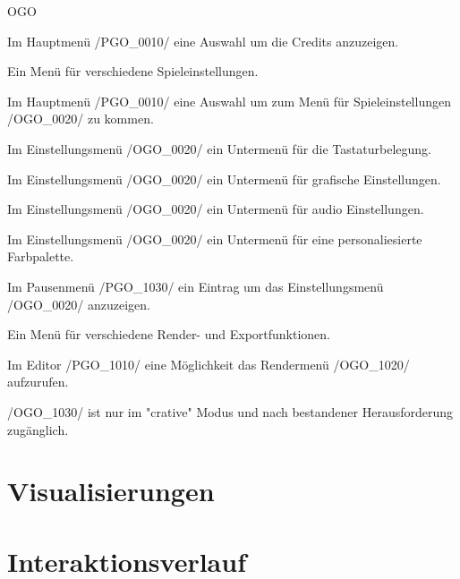 \begin{ids}{\gls{OGO}}

	\id[0010] Im Hauptmenü /PGO\_0010/ eine Auswahl um die Credits anzuzeigen.
	
	\id[0020] Ein Menü für verschiedene Spieleinstellungen.
	
	\id[0030] Im Hauptmenü /PGO\_0010/ eine Auswahl um zum Menü für Spieleinstellungen /OGO\_0020/ zu kommen.
	
	\id[0040] Im Einstellungsmenü /OGO\_0020/ ein Untermenü für die Tastaturbelegung.
	
	\id[0050] Im Einstellungsmenü /OGO\_0020/ ein Untermenü für grafische Einstellungen.
	
	\id[0060] Im Einstellungsmenü /OGO\_0020/ ein Untermenü für audio Einstellungen.
	
	\id[0070] Im Einstellungsmenü /OGO\_0020/ ein Untermenü für eine personaliesierte Farbpalette.
	
	\id[1010] Im Pausenmenü /PGO\_1030/ ein Eintrag um das Einstellungsmenü /OGO\_0020/ anzuzeigen.
	
	\id[1020] Ein Menü für verschiedene Render- und Exportfunktionen.
	
	\id[1030] Im Editor /PGO\_1010/ eine Möglichkeit das Rendermenü /OGO\_1020/ aufzurufen.
	
	\id[1040] /OGO\_1030/ ist nur im "crative" Modus und nach bestandener Herausforderung zugänglich.
	
\end{ids}



%
%
%
\clearpage



%
%
%



\section*{Visualisierungen}








\section{Interaktionsverlauf}

